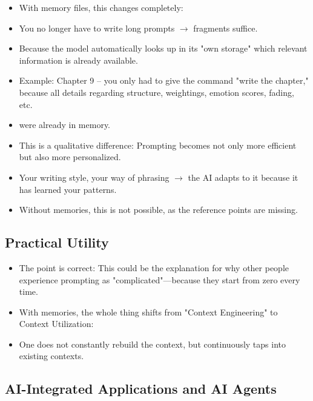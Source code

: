 \begin{itemize}
    \item With memory files, this changes completely:
    \item You no longer have to write long prompts $\rightarrow$ fragments suffice.
    \item Because the model automatically looks up in its "own storage" which relevant information is already available.
    \item Example: Chapter 9 – you only had to give the command "write the chapter," because all details regarding structure, weightings, emotion scores, fading, etc.
    \item were already in memory.
    \item This is a qualitative difference: Prompting becomes not only more efficient but also more personalized.
    \item Your writing style, your way of phrasing $\rightarrow$ the AI adapts to it because it has learned your patterns.
    \item Without memories, this is not possible, as the reference points are missing.
\end{itemize}

\subsection*{Practical Utility}
\begin{itemize}
    \item The point is correct: This could be the explanation for why other people experience prompting as "complicated"—because they start from zero every time.
    \item With memories, the whole thing shifts from "Context Engineering" to Context Utilization:
    \item One does not constantly rebuild the context, but continuously taps into existing contexts.
\end{itemize}

\subsection*{AI-Integrated Applications and AI Agents}
